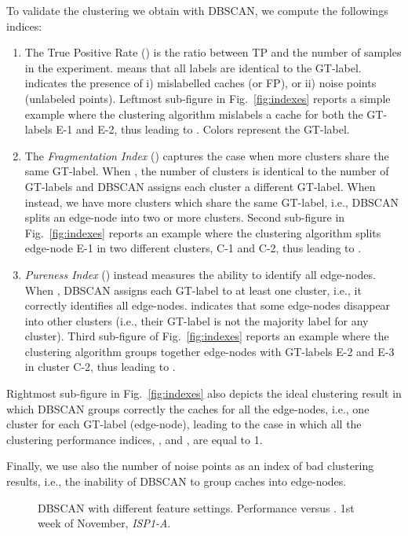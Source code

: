 \documentclass{acm_proc_article-sp}
\newcommand{\node}{{edge-node}\xspace}
\newcommand{\nodes}{{edge-nodes}\xspace}
\newcommand{\TApub}{\textit{ISP1-A}\xspace}
\begin{document}
To validate the clustering we obtain with DBSCAN, we compute the followings indices:
\label{eq:tp_measure}
\begin{enumerate}
\item The True Positive Rate () is the ratio between TP and the number of samples in the experiment.
 means that all labels are identical to the GT-label.  indicates the presence of i) mislabelled caches (or FP), or ii) noise points (unlabeled points). Leftmost sub-figure in Fig.~\ref{fig:indexes} reports a simple example where the clustering algorithm mislabels a cache for both the GT-labels E-1 and E-2, thus leading to . Colors represent the GT-label.

\item The \textit{Fragmentation Index} () captures the case when more clusters share the same GT-label.
When , the number of clusters is identical to the number of GT-labels and DBSCAN assigns each cluster a different GT-label. When  instead, we have more clusters which share the same GT-label, i.e., DBSCAN splits an \node into two or more clusters. Second sub-figure in Fig.~\ref{fig:indexes} reports an example where the clustering algorithm splits \node E-1 in two different clusters, C-1 and C-2, thus leading to .

\item \textit{Pureness Index} () instead measures the ability to
identify all edge-nodes. When , DBSCAN assigns each GT-label to at least one cluster, i.e., it correctly identifies all \nodes.  indicates that some \nodes disappear into other clusters (i.e., their GT-label is not the majority label for any cluster). Third sub-figure of Fig.~\ref{fig:indexes} reports an example where the clustering algorithm groups together \nodes with GT-labels E-2 and E-3 in cluster C-2, thus leading to .

\end{enumerate}

Rightmost sub-figure in Fig.~\ref{fig:indexes} also depicts the ideal clustering result in which DBSCAN groups correctly the caches for all the \nodes, i.e., one cluster for each GT-label (\node), leading to the case in which all the clustering performance indices, ,  and , are equal to 1.

Finally, we use also the number of noise points as an index of bad clustering results, i.e., the inability of DBSCAN to group caches into \nodes.

\begin{figure}[t!]
\caption{DBSCAN with different feature settings. Performance versus . 1st week of November, \TApub.}
\end{figure}
\end{document}
